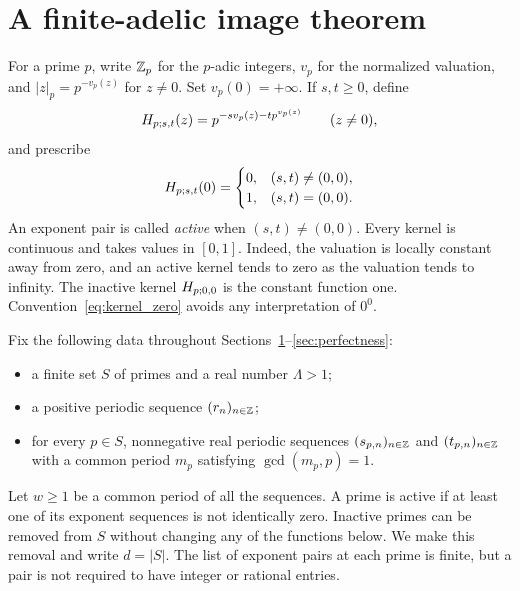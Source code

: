 \section{A finite-adelic image theorem}\label{sec:image}

For a prime $p$, write $\mathbb Z_p$ for the $p$-adic integers, $v_p$ for the
normalized valuation, and $|z|_p=p^{-v_p(z)}$ for $z\neq0$. Set
$v_p(0)=+\infty$. If $s,t\geq0$, define
\begin{equation}\label{eq:kernel}
 H_{p;s,t}(z)=p^{-s v_p(z)-t p^{v_p(z)}}\qquad(z\neq0),
\end{equation}
and prescribe
\begin{equation}\label{eq:kernel_zero}
 H_{p;s,t}(0)=
 \begin{cases}
  0,&(s,t)\neq(0,0),\\
  1,&(s,t)=(0,0).
 \end{cases}
\end{equation}
An exponent pair is called \emph{active} when $(s,t)\neq(0,0)$.
Every kernel is continuous and takes values in $[0,1]$.
Indeed, the valuation is locally constant away from zero, and an active
kernel tends to zero as the valuation tends to infinity.
The inactive kernel $H_{p;0,0}$ is the constant function one.
Convention~\eqref{eq:kernel_zero} avoids any interpretation of $0^0$.

Fix the following data throughout Sections~\ref{sec:image}--\ref{sec:perfectness}:
\begin{itemize}
 \item a finite set $S$ of primes and a real number $\Lambda>1$;
 \item a positive periodic sequence $(r_n)_{n\in\mathbb Z}$;
 \item for every $p\in S$, nonnegative real periodic sequences
 $(s_{p,n})_{n\in\mathbb Z}$ and $(t_{p,n})_{n\in\mathbb Z}$ with a common period
 $m_p$ satisfying $\gcd(m_p,p)=1$.
\end{itemize}
Let $w\geq1$ be a common period of all the sequences. A prime is active if
at least one of its exponent sequences is not identically zero. Inactive
primes can be removed from $S$ without changing any of the functions below.
We make this removal and write $d=|S|$. The list of exponent pairs at
each prime is finite, but a pair is not required to have integer or rational
entries.

